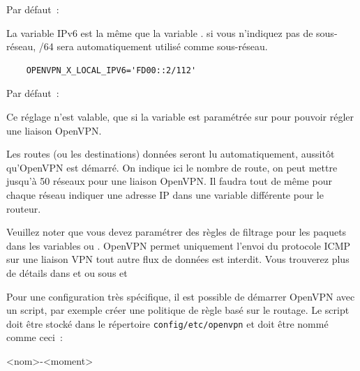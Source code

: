 \begin{description}

  Par défaut~: 

  La variable IPv6 est la même que la variable .
  si vous n'indiquez pas de sous-réseau, /64 sera automatiquement utilisé comme
  sous-réseau.

  \begin{example}
  \begin{verbatim}
    OPENVPN_X_LOCAL_IPV6='FD00::2/112'
  \end{verbatim}
  \end{example}


  Par défaut~: 

  Ce réglage n'est valable, que si la variable 
  est paramétrée sur  pour pouvoir régler une liaison OpenVPN.

  Les routes (ou les destinations) données seront lu automatiquement, aussitôt
  qu'OpenVPN est démarré. On indique ici le nombre de route, on peut mettre
  jusqu'à 50 réseaux pour une liaison OpenVPN. Il faudra tout de même pour
  chaque réseau indiquer une adresse IP dans une variable différente
   pour le routeur.

  Veuillez noter que vous devez paramétrer des règles de filtrage pour les paquets
  dans les variables  
  ou  . OpenVPN permet
  uniquement l'envoi du protocole ICMP sur une liaison VPN tout autre flux de données
  est interdit. Vous trouverez plus de détails dans
   et
   ou sous
   et

  Pour une configuration très spécifique, il est possible de démarrer OpenVPN avec
  un script, par exemple créer une politique de règle basé sur le routage.
  Le script doit être stocké dans le répertoire \texttt{config/etc/openvpn}
  et doit être nommé comme ceci~:

\begin{example}
  <nom>-<moment>
\end{example}


\end{description}
